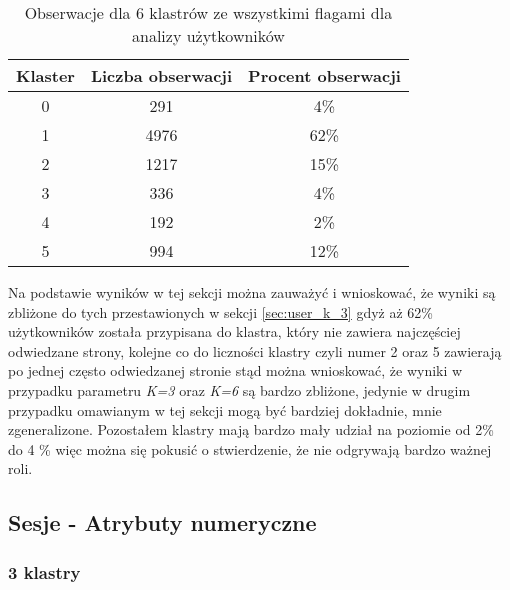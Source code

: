 \documentclass[../EDI_Task1_Karwowski_Kowalewski.tex]{subfiles}
\begin{document}
{{{            \begin{table}[!htbp]
                \footnotesize
                \centering
                \begin{tabular}{|c|c|c|}
                    \hline
                    Klaster & Liczba obserwacji & Procent obserwacji \\ \hline
                    0   &    291 &  4\% \\
                    1   &   4976 & 62\% \\
                    2   &   1217 & 15\% \\
                    3   &    336 &  4\% \\
                    4   &    192 &  2\% \\
                    5   &    994 & 12\% \\ \hline
                \end{tabular}
                \caption
                {Obserwacje dla 6 klastrów ze wszystkimi flagami dla analizy użytkowników}
                \label{stats_users_k_6}
            \end{table}
            \FloatBarrier

            Na podstawie wyników w tej sekcji można zauważyć i wnioskować, że
            wyniki są zbliżone do tych przestawionych w sekcji \ref{sec:user_k_3}
            gdyż aż 62\% użytkowników została przypisana do klastra, który nie zawiera
            najczęściej odwiedzane strony, kolejne co do liczności klastry czyli
            numer 2 oraz 5 zawierają po jednej często odwiedzanej stronie stąd
            można wnioskować, że wyniki w przypadku parametru \textit{K=3} oraz
            \textit{K=6} są bardzo zbliżone, jedynie w drugim przypadku omawianym w
            tej sekcji mogą być bardziej dokładnie, mnie zgeneralizone. Pozostałem
            klastry mają bardzo mały udział na poziomie od 2\% do 4 \% więc można
            się pokusić o stwierdzenie, że nie odgrywają bardzo ważnej roli.
        }
    }

    \subsection{Sesje - Atrybuty numeryczne} {

        \subsubsection{3 klastry}
        \label{sec:session_k_3} {

}}}
\end{document}
